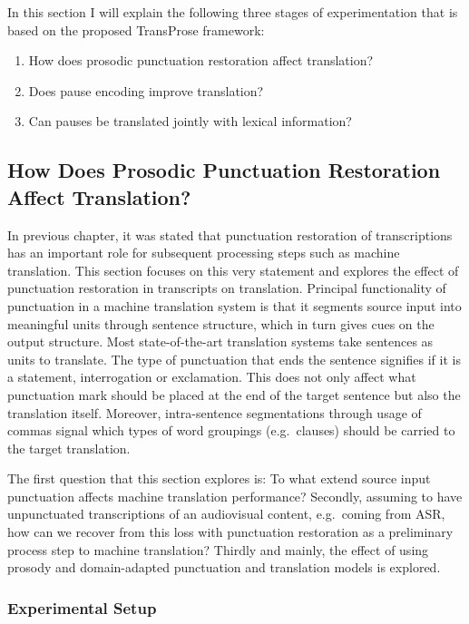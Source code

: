 In this section I will explain the following three stages of experimentation that is based on the proposed TransProse framework:

\begin{enumerate}
    \item How does prosodic punctuation restoration affect translation?
    \item Does pause encoding improve translation?
    \item Can pauses be translated jointly with lexical information?
\end{enumerate}

\subsection{How Does Prosodic Punctuation Restoration Affect Translation?}
\label{transProse:Q1}

In previous chapter, it was stated that punctuation restoration of transcriptions has an important role for subsequent processing steps such as machine translation. This section focuses on this very statement and explores the effect of punctuation restoration in transcripts on translation. Principal functionality of punctuation in a machine translation system is that it segments source input into meaningful units through sentence structure, which in turn gives cues on the output structure. Most state-of-the-art translation systems take sentences as units to translate. The type of punctuation that ends the sentence signifies if it is a statement, interrogation or exclamation. This does not only affect what punctuation mark should be placed at the end of the target sentence but also the translation itself. Moreover, intra-sentence segmentations through usage of commas signal which types of word groupings (e.g.~clauses) should be carried to the target translation.

The first question that this section explores is: To what extend source input punctuation affects machine translation performance? Secondly, assuming to have unpunctuated transcriptions of an audiovisual content, e.g.~coming from ASR, how can we recover from this loss with punctuation restoration as a preliminary process step to machine translation? Thirdly and mainly, the effect of using prosody and domain-adapted punctuation and translation models is explored. 

\subsubsection{Experimental Setup}

